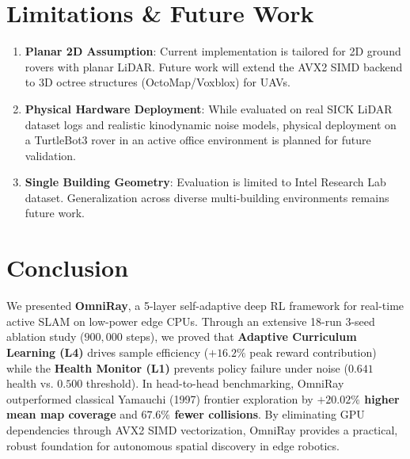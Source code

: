 \documentclass[11pt,a4paper]{article}
\begin{document}
\section{Limitations \& Future Work}

\begin{enumerate}
    \item \textbf{Planar 2D Assumption}: Current implementation is tailored for 2D ground rovers with planar LiDAR. Future work will extend the AVX2 SIMD backend to 3D octree structures (OctoMap/Voxblox) for UAVs.
    
    \item \textbf{Physical Hardware Deployment}: While evaluated on real SICK LiDAR dataset logs and realistic kinodynamic noise models, physical deployment on a TurtleBot3 rover in an active office environment is planned for future validation.
    
    \item \textbf{Single Building Geometry}: Evaluation is limited to Intel Research Lab dataset. Generalization across diverse multi-building environments remains future work.
\end{enumerate}

\section{Conclusion}

We presented \textbf{OmniRay}, a 5-layer self-adaptive deep RL framework for real-time active SLAM on low-power edge CPUs. Through an extensive 18-run 3-seed ablation study ($900,000$ steps), we proved that \textbf{Adaptive Curriculum Learning (L4)} drives sample efficiency ($+16.2\%$ peak reward contribution) while the \textbf{Health Monitor (L1)} prevents policy failure under noise ($0.641$ health vs. $0.500$ threshold). In head-to-head benchmarking, OmniRay outperformed classical Yamauchi (1997) frontier exploration by \textbf{$+20.02\%$ higher mean map coverage} and \textbf{$67.6\%$ fewer collisions}. By eliminating GPU dependencies through AVX2 SIMD vectorization, OmniRay provides a practical, robust foundation for autonomous spatial discovery in edge robotics.
\end{document}
